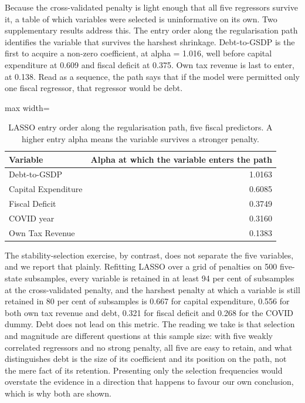 \documentclass[12pt,a4paper]{article}
\begin{document}
Because the cross-validated penalty is light enough that all five regressors survive it, a table of which variables were selected is uninformative on its own. Two supplementary results address this. The entry order along the regularisation path identifies the variable that survives the harshest shrinkage. Debt-to-GSDP is the first to acquire a non-zero coefficient, at alpha = 1.016, well before capital expenditure at 0.609 and fiscal deficit at 0.375. Own tax revenue is last to enter, at 0.138. Read as a sequence, the path says that if the model were permitted only one fiscal regressor, that regressor would be debt.

\begin{table}[H]
\centering
\caption{LASSO entry order along the regularisation path, five fiscal predictors. A higher entry alpha means the variable survives a stronger penalty.}
\label{tab:25}
\footnotesize
\begin{adjustbox}{max width=\textwidth}
\begin{tabular}{@{}lr@{}}
\toprule
Variable & Alpha at which the variable enters the path \\
\midrule
Debt-to-GSDP & 1.0163 \\
Capital Expenditure & 0.6085 \\
Fiscal Deficit & 0.3749 \\
COVID year & 0.3160 \\
Own Tax Revenue & 0.1383 \\
\bottomrule
\end{tabular}
\end{adjustbox}
\end{table}

The stability-selection exercise, by contrast, does not separate the five variables, and we report that plainly. Refitting LASSO over a grid of penalties on 500 five-state subsamples, every variable is retained in at least 94 per cent of subsamples at the cross-validated penalty, and the harshest penalty at which a variable is still retained in 80 per cent of subsamples is 0.667 for capital expenditure, 0.556 for both own tax revenue and debt, 0.321 for fiscal deficit and 0.268 for the COVID dummy. Debt does not lead on this metric. The reading we take is that selection and magnitude are different questions at this sample size: with five weakly correlated regressors and no strong penalty, all five are easy to retain, and what distinguishes debt is the size of its coefficient and its position on the path, not the mere fact of its retention. Presenting only the selection frequencies would overstate the evidence in a direction that happens to favour our own conclusion, which is why both are shown.
\end{document}
